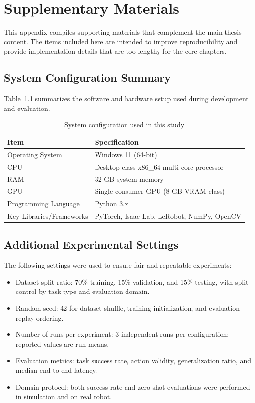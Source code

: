 \cleardoublepage
\chapter{Supplementary Materials}
\label{app:supplementary}

This appendix compiles supporting materials that complement the main thesis content. The items included here are intended to improve reproducibility and provide implementation details that are too lengthy for the core chapters.

\section{System Configuration Summary}
Table~\ref{tab:appendix-system-config} summarizes the software and hardware setup used during development and evaluation.

\begin{table}[ht]
    \centering
    \caption{System configuration used in this study}
    \label{tab:appendix-system-config}
    \begin{tabular}{ll}
        \hline
        Item & Specification \\
        \hline
        Operating System & Windows 11 (64-bit) \\
        CPU & Desktop-class x86\_64 multi-core processor \\
        RAM & 32 GB system memory \\
        GPU & Single consumer GPU (8 GB VRAM class) \\
        Programming Language & Python 3.x \\
        Key Libraries/Frameworks & PyTorch, Isaac Lab, LeRobot, NumPy, OpenCV \\
        \hline
    \end{tabular}
\end{table}

\section{Additional Experimental Settings}
The following settings were used to ensure fair and repeatable experiments:

\begin{itemize}
    \item Dataset split ratio: 70\% training, 15\% validation, and 15\% testing, with split control by task type and evaluation domain.
    \item Random seed: 42 for dataset shuffle, training initialization, and evaluation replay ordering.
    \item Number of runs per experiment: 3 independent runs per configuration; reported values are run means.
    \item Evaluation metrics: task success rate, action validity, generalization ratio, and median end-to-end latency.
    \item Domain protocol: both success-rate and zero-shot evaluations were performed in simulation and on real robot.
\end{itemize}

